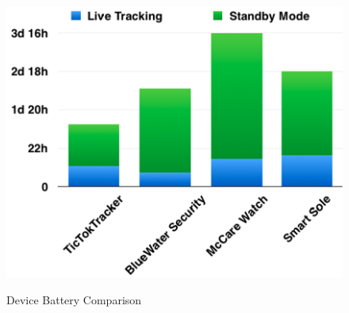 \begin{figure}[htbp]
  \centering
  
    {\includegraphics[height=2.8 in,width=0.55\linewidth]{Chapters/Figures/21.png}}%
 
  \caption{Device Battery Comparison}
  \label{fig:Device-battery-Comparison}
\end{figure}

